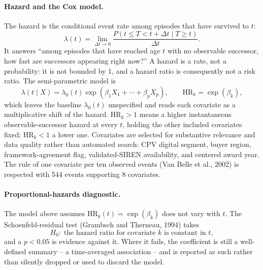 \documentclass[11pt,a4paper]{article}
\begin{document}
\paragraph{Hazard and the Cox model.} The hazard is the conditional event rate
among episodes that have survived to \(t\):
\[
\lambda(t)=\lim_{\Delta t\to 0}
\frac{P(t\le T<t+\Delta t\mid T\ge t)}{\Delta t} .
\]
It answers ``among episodes that have reached age \(t\) with no observable
successor, how fast are successors appearing right now?'' A hazard is a rate,
not a probability: it is not bounded by 1, and a hazard ratio is consequently
not a risk ratio. The semi-parametric model is
\[
\lambda(t\mid X)=\lambda_0(t)\exp(\beta_1X_1+\cdots+\beta_pX_p),
\qquad
\mathrm{HR}_k=\exp(\beta_k),
\]
which leaves the baseline \(\lambda_0(t)\) unspecified and reads each covariate
as a multiplicative shift of the hazard. \(\mathrm{HR}_k>1\) means a higher
instantaneous observable-successor hazard at every \(t\), holding the other
included covariates fixed; \(\mathrm{HR}_k<1\) a lower one. Covariates are
selected for substantive relevance and data quality rather than automated
search: CPV digital segment, buyer region, framework-agreement flag,
validated-SIREN availability, and centered award year. The rule of one
covariate per ten observed events (Van Belle et al., 2002) is respected with
544 events supporting
8 covariates.

\paragraph{Proportional-hazards diagnostic.} The model above assumes
\(\mathrm{HR}_k(t)=\exp(\beta_k)\) does not vary with \(t\). The
Schoenfeld-residual test (Grambsch and Therneau, 1994) takes
\[
H_0:\;\text{the hazard ratio for covariate } k \text{ is constant in } t,
\]
and a \(p<0.05\) is evidence against it. Where it fails, the coefficient is
still a well-defined summary -- a time-averaged association -- and is reported
as such rather than silently dropped or used to discard the model.
\end{document}
